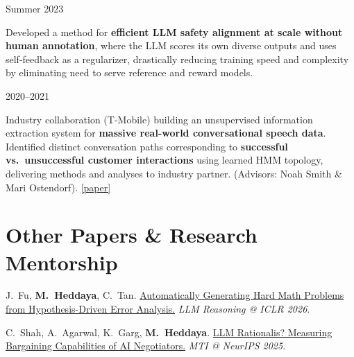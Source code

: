 \documentclass[11pt,letterpaper]{article}
\begin{document}
\vspace{4pt}
 \hfill Summer 2023
\begin{cvitems}
    \item Developed a method for \textbf{efficient LLM safety alignment at scale without human annotation}, where the LLM scores its own diverse outputs and uses self-feedback as a regularizer, drastically reducing training speed and complexity by eliminating need to serve reference and reward models.
\end{cvitems}


\break
{} \hfill 2020--2021
\begin{cvitems}
    \item Industry collaboration (T-Mobile) building an unsupervised information extraction system for
    \textbf{massive real-world conversational speech data}. Identified distinct conversation paths corresponding to \textbf{successful vs.\ unsuccessful customer interactions} using learned HMM topology, delivering methods and analyses to industry partner. (Advisors: Noah Smith \& Mari Ostendorf). \href{https://aclanthology.org/2022.findings-emnlp.415/}{[paper]}
\end{cvitems}

\section*{Other Papers \& Research Mentorship}

\begin{cvitems}
    \item J.\ Fu, \textbf{M.\ Heddaya}, C.\ Tan. \href{https://openreview.net/forum?id=d1PcXKaAON}{Automatically Generating Hard Math Problems from Hypothesis-Driven Error Analysis.} \textit{LLM Reasoning @ ICLR 2026}.
    \item C.\ Shah, A.\ Agarwal, K.\ Garg, \textbf{M.\ Heddaya}. \href{https://neurips.cc/virtual/2025/loc/san-diego/128019}{LLM Rationalis? Measuring Bargaining Capabilities of AI Negotiators.} \textit{MTI @ NeurIPS 2025}.
\end{cvitems}

\end{document}
